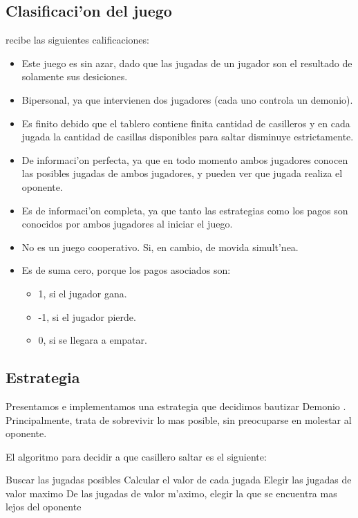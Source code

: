 \subsection{Clasificaci'on del juego}
 recibe las siguientes calificaciones:
\begin{itemize}
\item Este juego es sin azar, dado que las jugadas de un jugador son el resultado de solamente sus desiciones.
\item Bipersonal, ya que intervienen dos jugadores (cada uno controla un demonio).
\item Es finito debido que el tablero contiene finita cantidad de casilleros y en cada jugada la cantidad de casillas disponibles para saltar disminuye estrictamente.
\item De informaci'on perfecta, ya que en todo momento ambos jugadores conocen las posibles jugadas de ambos jugadores, y pueden ver que jugada realiza el oponente.
\item Es de informaci'on completa, ya que tanto las estrategias como los pagos son conocidos por ambos jugadores al iniciar el juego.
\item No es un juego cooperativo. Si, en cambio, de movida simult'nea.
\item Es de suma cero, porque los pagos asociados son:
	\begin{itemize}
	\item 1, si el jugador gana.
	\item -1, si el jugador pierde.
	\item 0, si se llegara a empatar.
	\end{itemize}
\end{itemize}


\subsection{Estrategia}
Presentamos e implementamos una estrategia que decidimos bautizar Demonio . Principalmente, trata de sobrevivir lo mas posible, sin preocuparse en molestar al oponente. 

El algoritmo para decidir a que casillero saltar es el siguiente:


\begin{algorithmic}[1]
\STATE Buscar las jugadas posibles
\STATE Calcular el valor de cada jugada
\STATE Elegir las jugadas de valor maximo
\RETURN De las jugadas de valor m'aximo, elegir la que se encuentra mas lejos del oponente
\end{algorithmic}



